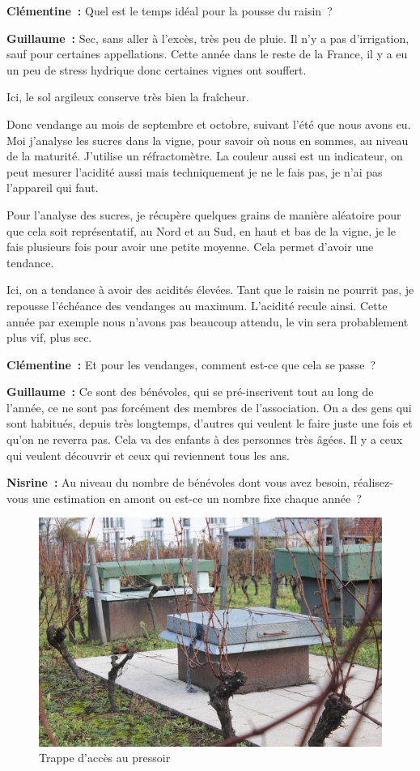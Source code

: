 \documentclass[a4paper, titlepage]{report}
\begin{document}
\textbf{Clémentine~:} Quel est le temps idéal pour la pousse du raisin~?

\textbf{Guillaume~:} Sec, sans aller à l'excès, très peu de pluie. Il
n'y a pas d'irrigation, sauf pour certaines appellations. Cette année
dans le reste de la France, il y a eu un peu de stress hydrique donc
certaines vignes ont souffert.

Ici, le sol argileux conserve très bien la fraîcheur.

Donc vendange au mois de septembre et octobre, suivant l'été que nous
avons eu. Moi j'analyse les sucres dans la vigne, pour savoir où nous
en sommes, au niveau de la maturité. J'utilise un réfractomètre. La
couleur aussi est un indicateur, on peut mesurer l'acidité aussi mais
techniquement je ne le fais pas, je n'ai pas l'appareil qui faut.

Pour l'analyse des sucres, je récupère quelques grains de manière
aléatoire pour que cela soit représentatif, au Nord et au Sud, en haut
et bas de la vigne, je le fais plusieurs fois pour avoir une petite
moyenne. Cela permet d'avoir une tendance.

Ici, on a tendance à avoir des acidités élevées. Tant que le raisin ne
pourrit pas, je repousse l'échéance des vendanges au maximum. L'acidité
recule ainsi. Cette année par exemple nous n'avons pas beaucoup attendu,
le vin sera probablement plus vif, plus sec.

\textbf{Clémentine~:} Et pour les vendanges, comment est-ce que cela se
passe~?

\textbf{Guillaume~:} Ce sont des bénévoles, qui se pré-inscrivent tout au long
de l'année, ce ne sont pas forcément des membres de l'association. On a
des gens qui sont habitués, depuis très longtemps, d'autres qui veulent
le faire juste une fois et qu'on ne reverra pas. Cela va des enfants à
des personnes très âgées. Il y a ceux qui veulent découvrir et ceux qui
reviennent tous les ans.

\textbf{Nisrine~:} Au niveau du nombre de bénévoles dont vous avez
besoin, réalisez-vous une estimation en amont ou est-ce un nombre fixe
chaque année~?

\begin{figure}[!h]
\includegraphics{Images/pressoir.jpg}
\caption{Trappe d'accès au pressoir}
\end{figure}
\end{document}
